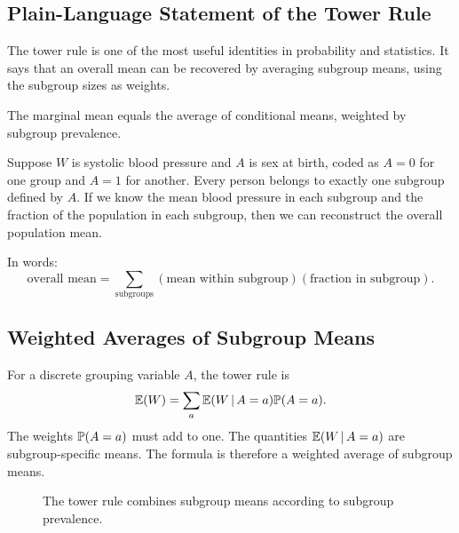 \label{lec:1-6}

\subsection{Plain-Language Statement of the Tower Rule}

The tower rule is one of the most useful identities in probability and statistics. It says that an overall mean can be recovered by averaging subgroup means, using the subgroup sizes as weights.

\begin{keyidea}
The marginal mean equals the average of conditional means, weighted by subgroup prevalence.
\end{keyidea}

Suppose $W$ is systolic blood pressure and $A$ is sex at birth, coded as $A=0$ for one group and $A=1$ for another. Every person belongs to exactly one subgroup defined by $A$. If we know the mean blood pressure in each subgroup and the fraction of the population in each subgroup, then we can reconstruct the overall population mean.

In words:
\[
\text{overall mean}
=
\sum_{\text{subgroups}}
(\text{mean within subgroup})(\text{fraction in subgroup}).
\]

\subsection{Weighted Averages of Subgroup Means}

For a discrete grouping variable $A$, the tower rule is
\[
\mathbb{E}(W)=\sum_a \mathbb{E}(W\,\vert\, A=a)\mathbb{P}(A=a).
\]
The weights $\mathbb{P}(A=a)$ must add to one. The quantities $\mathbb{E}(W\,\vert\, A=a)$ are subgroup-specific means. The formula is therefore a weighted average of subgroup means.

\begin{figure}[H]
\centering
{}
\caption{The tower rule combines subgroup means according to subgroup prevalence.}
\end{figure}

